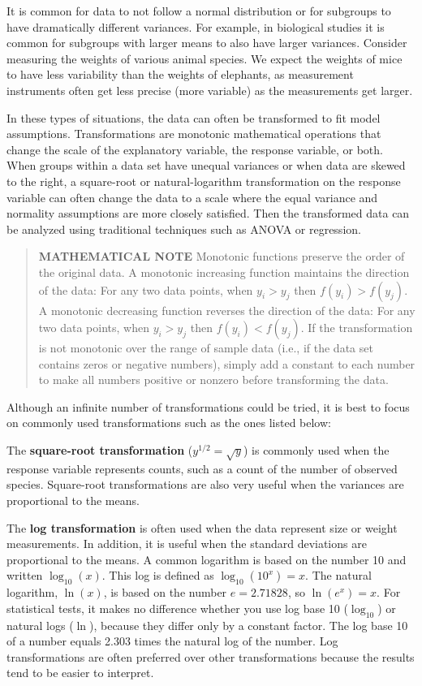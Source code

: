 \documentclass[
]{book}
\begin{document}
It is common for data to not follow a normal distribution or for subgroups to have dramatically different variances. For example, in biological studies it is common for subgroups with larger means to also have larger variances. Consider measuring the weights of various animal species. We expect the weights of mice to have less variability than the weights of elephants, as measurement instruments often get less precise (more variable) as the measurements get larger.

In these types of situations, the data can often be transformed to fit model assumptions. Transformations are monotonic mathematical operations that change the scale of the explanatory variable, the response variable, or both. When groups within a data set have unequal variances or when data are skewed to the right, a square-root or natural-logarithm transformation on the response variable can often change the data to a scale where the equal variance and normality assumptions are more closely satisfied. Then the transformed data can be analyzed using traditional techniques such as ANOVA or regression.

\begin{quote}
\textbf{MATHEMATICAL NOTE} Monotonic functions preserve the order of the original data. A monotonic increasing function maintains the direction of the data: For any two data points, when \(y_i > y_j\) then \(f(y_i) > f(y_j)\). A monotonic decreasing function reverses the direction of the data: For any two data points, when \(y_i > y_j\) then \(f(y_i) < f(y_j)\). If the transformation is not monotonic over the range of sample data (i.e., if the data set contains zeros or negative numbers), simply add a constant to each number to make all numbers positive or nonzero before transforming the data.
\end{quote}

Although an infinite number of transformations could be tried, it is best to focus on commonly used transformations such as the ones listed below:

The \textbf{square-root transformation} (\(y^{1/2} = \sqrt{y}\)) is commonly used when the response variable represents counts, such as a count of the number of observed species. Square-root transformations are also very useful when the variances are proportional to the means.

The \textbf{log transformation} is often used when the data represent size or weight measurements. In addition, it is useful when the standard deviations are proportional to the means. A common logarithm is based on the number 10 and written \(\log_{10}(x)\). This log is defined as \(\log_{10}(10^x) = x\). The natural logarithm, \(\ln(x)\), is based on the number \(e = 2.71828\), so \(\ln(e^x) = x\). For statistical tests, it makes no difference whether you use log base 10 (\(\log_{10}\)) or natural logs (\(\ln\)), because they differ only by a constant factor. The log base 10 of a number equals 2.303 times the natural log of the number. Log transformations are often preferred over other transformations because the results tend to be easier to interpret.
\end{document}
